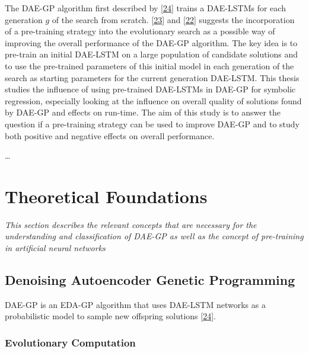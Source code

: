 \documentclass[
  11pt,
]{article}
\begin{document}
The DAE-GP algorithm first described by {[}\protect\hyperlink{ref-dae-gp_2020_rtree}{24}{]} trains a DAE-LSTMs for each generation \(g\) of the search from scratch.
{[}\protect\hyperlink{ref-dae-gp_2022_symreg}{23}{]} and {[}\protect\hyperlink{ref-daegp_explore_exploit}{22}{]} suggests the incorporation of a pre-training strategy into the evolutionary search as a possible way of improving the overall performance of the DAE-GP algorithm.
The key idea is to pre-train an initial DAE-LSTM on a large population of candidate solutions and to use the pre-trained parameters of this initial model in each generation of the search as starting parameters for the current generation DAE-LSTM.
This thesis studies the influence of using pre-trained DAE-LSTMs in DAE-GP for symbolic regression, especially looking at the influence on overall quality of solutions found by DAE-GP and effects on run-time.
The aim of this study is to answer the question if a pre-training strategy can be used to improve DAE-GP and to study both positive and negative effects on overall performance.

\ldots{}

\hypertarget{theoretical-foundations}{%
\section{Theoretical Foundations}\label{theoretical-foundations}}

\emph{This section describes the relevant concepts that are necessary for the understanding and classification of DAE-GP as well as the concept of pre-training in artificial neural networks}

\hypertarget{denoising-autoencoder-genetic-programming}{%
\subsection{Denoising Autoencoder Genetic Programming}\label{denoising-autoencoder-genetic-programming}}

DAE-GP is an EDA-GP algorithm that uses DAE-LSTM networks as a probabilistic model to sample new offspring solutions {[}\protect\hyperlink{ref-dae-gp_2020_rtree}{24}{]}.

\hypertarget{evolutionary-computation}{%
\subsubsection{Evolutionary Computation}\label{evolutionary-computation}}
\end{document}
